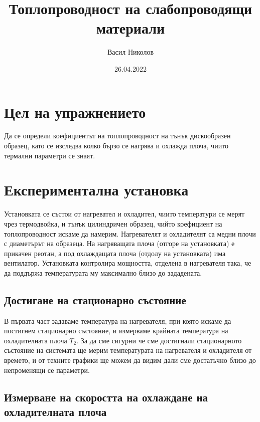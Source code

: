 \documentclass[reprint,amsmath,amssymb,aps,floatfix]{revtex4-2}
\begin{document}
\setlength{\abovedisplayskip}{3pt}
\setlength{\belowdisplayskip}{3pt}    

\title{Топлопроводност на слабопроводящи материали}

\author{Васил Николов}
\date{26.04.2022}
\maketitle


\section{Цел на упражнението}

Да се определи коефициентът на топлопроводност на тънък дискообразен образец, като се изследва колко бързо се нагрява и охлажда плоча, чиито термални параметри се знаят. 

\section{Експериментална установка}

Установката се състои от нагревател и охладител, чиито температури се мерят чрез термодвойка, и тънък цилиндричен образец, чийто коефициент на топлопроводност искаме да намерим. Нагревателят и охладителят са медни плочи с диаметърът на образеца. На нагряващата плоча (отгоре на установката) е прикачен реотан, а под охлаждащата плоча (отдолу на установката) има вентилатор. Установката контролира мощността, отделена в нагревателя така, че да поддържа температурата му максимално близо до зададената.

\subsection{Достигане на стационарно състояние}

В първата част задаваме температура на нагревателя, при която искаме да постигнем стационарно състояние, и измерваме крайната температура на охладителната плоча $T_2$. За да сме сигурни че сме достигнали стационарното състояние на системата ще мерим температурата на нагревателя и охладителя от времето, и от техните графики ще можем да видим дали сме достатъчно близо до непроменящи се параметри.

\subsection{Измерване на скоростта на охлаждане на охладителната плоча}
\end{document}
